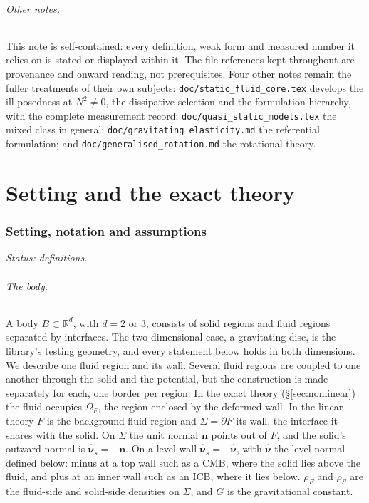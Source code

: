 \documentclass[11pt]{article}
\theoremstyle{definition}
\theoremstyle{remark}
\newcommand{\R}{\mathbb{R}}
\newcommand{\bn}{\mathbf{n}}
\newcommand{\code}[1]{\texttt{#1}}
\newcommand{\nuh}{\hat{\boldsymbol{\nu}}}
\newcommand{\nuhs}{\hat{\boldsymbol{\nu}}_s}
\newcommand{\status}[1]{\noindent\emph{Status: #1}\par\smallskip}
\begin{document}
\paragraph{Other notes.} This note is self-contained: every
definition, weak form and measured number it relies on is stated or
displayed within it. The file references kept throughout are
provenance and onward reading, not prerequisites. Four other notes
remain the fuller treatments of their own subjects:
\code{doc/static\_fluid\_core.tex} develops the ill-posedness at $N^2
\ne 0$, the dissipative selection and the formulation hierarchy, with
the complete measurement record; \code{doc/quasi\_static\_models.tex}
the mixed class in general; \code{doc/gravitating\_elasticity.md} the
referential formulation; and \code{doc/generalised\_rotation.md} the
rotational theory.

\tableofcontents

\part{Setting and the exact theory}

\section{Setting, notation and assumptions}
\label{sec:setting}

\status{definitions.}

\paragraph{The body.} A body $B \subset \R^d$, with $d = 2$ or $3$,
consists of solid regions and fluid regions separated by interfaces.
The two-dimensional case, a gravitating disc, is the library's
testing geometry, and every statement below holds in both dimensions.
We describe one fluid region and its wall. Several fluid regions are
coupled to one another through the solid and the potential, but the
construction is made separately for each, one border per region. In
the exact theory (\S\ref{sec:nonlinear}) the fluid occupies
$\Omega_F$, the region enclosed by the deformed wall. In the linear
theory $F$ is the background fluid region and $\Sigma = \partial F$
its wall, the interface it shares with the solid. On $\Sigma$ the
unit normal $\bn$ points out of $F$, and the solid's outward normal is
$\nuhs = -\bn$. On a level wall $\nuhs = \mp\nuh$, with $\nuh$ the
level normal defined below: minus at a top wall such as a CMB, where
the solid lies above the fluid, and plus at an inner wall such as an
ICB, where it lies below. $\rho_F$ and $\rho_S$ are the fluid-side
and solid-side densities on $\Sigma$, and $G$ is the gravitational
constant.
\end{document}

